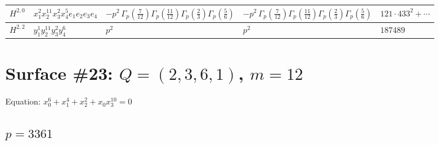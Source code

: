 \documentclass[11pt]{article}
\begin{document}
\begin{table}[ht]
{\begin{tabular}{@{}lllll@{}}
\midrule
$H^{2,0}$ & $x_{1}^{2} x_{2}^{11} x_{3}^{2} x_{4}^{5}  e_{1} e_{2} e_{3} e_{4}$ & $- p^{2} \, \Gamma_p \left( \frac{7}{12} \right) \Gamma_p \left( \frac{11}{12} \right) \Gamma_p \left( \frac{2}{3} \right) \Gamma_p \left( \frac{5}{6} \right)$ & $- p^{2} \, \Gamma_p \left( \frac{7}{12} \right) \Gamma_p \left( \frac{11}{12} \right) \Gamma_p \left( \frac{2}{3} \right) \Gamma_p \left( \frac{5}{6} \right)$ & $121{\cdot}433^{2}{+}\cdots$ \\
\midrule
$H^{2,2}$ & $y_{1}^{1} y_{2}^{11} y_{3}^{2} y_{4}^{6}$ & $p^{2} \,$ & $p^{2} \,$ & $187489$ \\
\bottomrule
\end{tabular}
}
\renewcommand{\arraystretch}{1.0}
\end{table}

\newpage

\section*{Surface \#23: $Q=(2, 3, 6, 1)$, $m=12$}

Equation: $x_0^{6} + x_1^{4} + x_2^{2} + x_0 x_3^{10} = 0$

\subsection*{$p = 3361$}
\end{document}
